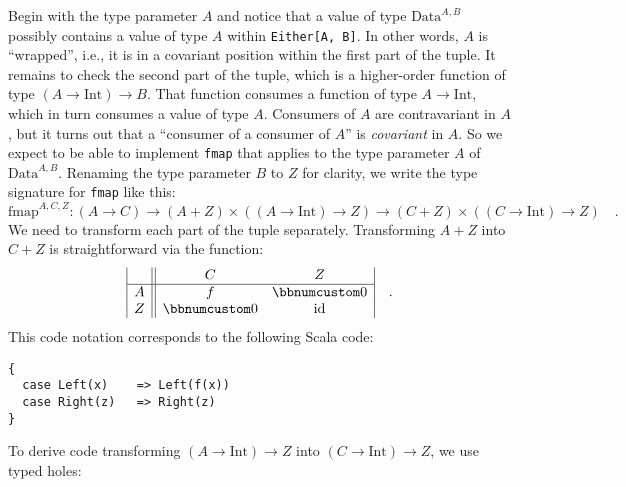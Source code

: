 Begin with the type parameter $A$ and notice that a value of type
$\text{Data}^{A,B}$ possibly contains a value of type $A$ within
\lstinline!Either[A, B]!. In other words, $A$ is \textsf{``}wrapped\textsf{''},
i.e., it is in a covariant position within the first part of the tuple.
It remains to check the second part of the tuple, which is a higher-order
function of type $\left(A\rightarrow\text{Int}\right)\rightarrow B$.
That function consumes a function of type $A\rightarrow\text{Int}$,
which in turn consumes a value of type $A$. Consumers of $A$ are
contravariant in $A$, but it turns out that a \textsf{``}consumer of a consumer
of $A$\textsf{''} is \emph{covariant} in $A$. So we expect to be able to
implement \lstinline!fmap! that applies to the type parameter $A$
of $\text{Data}^{A,B}$. Renaming the type parameter $B$ to $Z$
for clarity, we write the type signature for \lstinline!fmap! like
this:
\[
\text{fmap}^{A,C,Z}:\left(A\rightarrow C\right)\rightarrow\left(A+Z\right)\times\left(\left(A\rightarrow\text{Int}\right)\rightarrow Z\right)\rightarrow\left(C+Z\right)\times\left(\left(C\rightarrow\text{Int}\right)\rightarrow Z\right)\quad.
\]
We need to transform each part of the tuple separately. Transforming
$A+Z$ into $C+Z$ is straightforward via the function:
\[
\begin{array}{|c||cc|}
 & C & Z\\
\hline A & f & \bbnum 0\\
Z & \bbnum 0 & \text{id}
\end{array}\quad.
\]
This code notation corresponds to the following Scala code:
\begin{lstlisting}
{
  case Left(x)    => Left(f(x))
  case Right(z)   => Right(z)
}
\end{lstlisting}
To derive code transforming $\left(A\rightarrow\text{Int}\right)\rightarrow Z$
into $\left(C\rightarrow\text{Int}\right)\rightarrow Z$, we use typed
holes:
